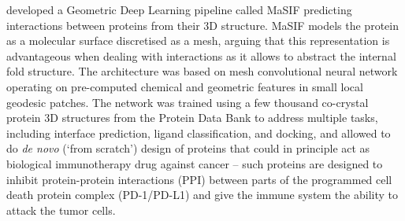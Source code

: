 \cite{gainza2020deciphering} developed a Geometric Deep Learning pipeline called MaSIF predicting interactions between proteins from their 3D structure. MaSIF models the protein as a molecular surface discretised as a mesh, arguing that this representation is advantageous when dealing with interactions as it allows to abstract the internal fold structure. The architecture was based on mesh convolutional neural network operating on pre-computed chemical and geometric features in small local geodesic patches. %
The network was trained using a few thousand co-crystal protein 3D structures from the Protein Data Bank to address multiple tasks, including interface prediction, ligand classification, and docking, and allowed to do {\em de novo} (`from scratch') design of proteins that could in principle act as biological immunotherapy drug against cancer -- such proteins are designed to inhibit protein-protein interactions (PPI) between parts of the programmed cell death protein complex (PD-1/PD-L1) and give the immune system the ability to attack the tumor cells.%




